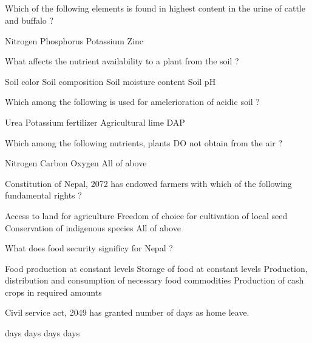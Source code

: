 
\subsection*{}

\begin{questions}

\question Which of the following elements is found in highest content in the urine of cattle and buffalo ?
  \begin{choices}
  \choice Nitrogen
  \choice Phosphorus
  \choice Potassium
  \choice Zinc
  \end{choices}

\question What affects the nutrient availability to a plant from the soil ?
  \begin{choices}
  \choice Soil color
  \choice Soil composition
  \choice Soil moisture content
  \choice Soil pH
  \end{choices}

\question Which among the following is used for amelerioration of acidic soil ?
  \begin{choices}
  \choice Urea
  \choice Potassium fertilizer
  \choice Agricultural lime
  \choice DAP
  \end{choices}

\question Which among the following nutrients, plants DO not obtain from the air ?
  \begin{choices}
  \choice Nitrogen
  \choice Carbon
  \choice Oxygen
  \choice All of above
  \end{choices}

\question Constitution of Nepal, 2072 has endowed farmers with which of the following fundamental rights ?
  \begin{choices}
  \choice Access to land for agriculture
  \choice Freedom of choice for cultivation of local seed
  \choice Conservation of indigenous species
  \choice All of above
  \end{choices}

\question What does food security significy for Nepal ?
  \begin{choices}
  \choice Food production at constant levels
  \choice Storage of food at constant levels
  \choice Production, distribution and consumption of necessary food commodities
  \choice Production of cash crops in required amounts
  \end{choices}

\question Civil service act, 2049 has granted \fillin[][3cm] number of days as home leave.
  \begin{choices}
   days
   days
   days
   days
  \end{choices}


\end{questions}
